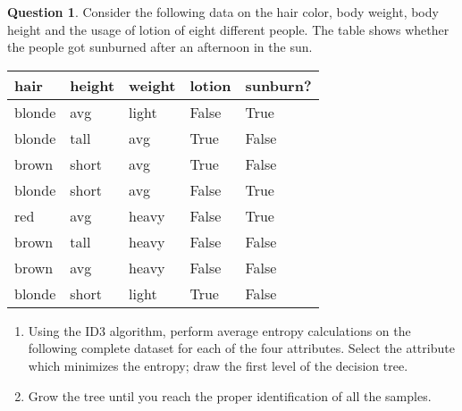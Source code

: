 \documentclass[11pt,a4paper]{article}
\theoremstyle{definition}%
\newtheorem{Q}{Question}[] %
\begin{document}
\begin{Q}
Consider the following data on the hair color, body weight, body height and the usage of lotion of
eight different people. The table shows whether the people got sunburned after an afternoon in the
sun.
\begin{center}
\begin{tabular}{|l|l|l|l|l|}
\hline
\textbf{hair} & \textbf{height} & \textbf{weight} & \textbf{lotion} & \textbf{sunburn?} \\ \hline
blonde        & avg             & light           & False           & True             \\ \hline
blonde        & tall            & avg             & True            & False            \\ \hline
brown         & short           & avg             & True            & False            \\ \hline
blonde        & short           & avg             & False           & True             \\ \hline
red           & avg             & heavy           & False           & True             \\ \hline
brown         & tall            & heavy           & False           & False            \\ \hline
brown         & avg             & heavy           & False           & False            \\ \hline
blonde        & short           & light           & True            & False            \\ \hline
\end{tabular}
\end{center}

\begin{enumerate}
    \item Using the ID3 algorithm, perform average entropy calculations on the following complete 
        dataset for each of the four attributes. Select the attribute which minimizes the entropy;
        draw the first level of the decision tree.
    \item Grow the tree until you reach the proper identification of all the samples.
    \end{enumerate}


\end{Q}
\end{document}
